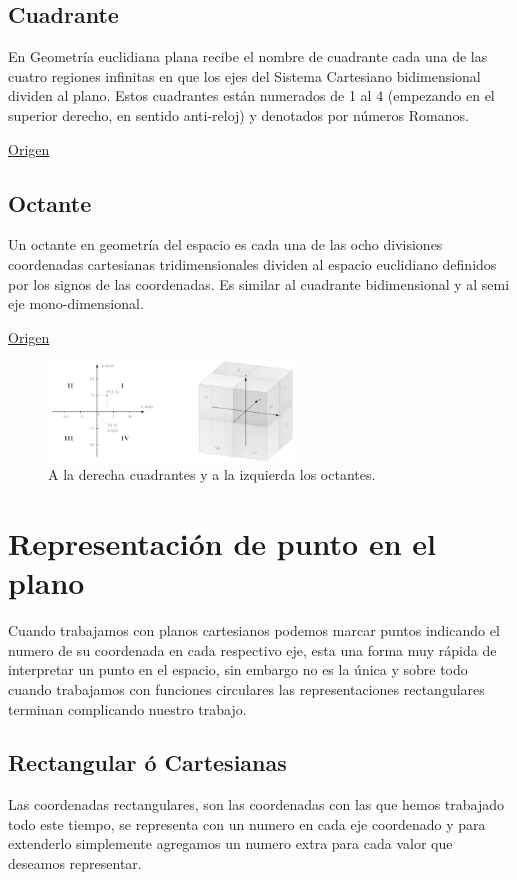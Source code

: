 \documentclass{article}
\begin{document}
\subsection{Cuadrante}
\label{sec:org2305e20}
En Geometría euclidiana plana recibe el nombre de cuadrante cada una de las cuatro regiones infinitas en que los ejes del Sistema Cartesiano bidimensional dividen al plano. Estos cuadrantes están numerados de 1 al 4 (empezando en el superior derecho, en sentido anti-reloj) y denotados por números Romanos.

\href{https://es.wikipedia.org/wiki/Cuadrante\_(geometr\%C3\%ADa)}{Origen}

\subsection{Octante}
\label{sec:org06f405a}
Un octante en geometría del espacio es cada una de las ocho divisiones coordenadas cartesianas tridimensionales dividen al espacio euclidiano definidos por los signos de las coordenadas. Es similar al cuadrante bidimensional y al semi eje mono-dimensional.

\href{https://es.wikipedia.org/wiki/Octante\_(geometr\%C3\%ADa)}{Origen}

\begin{figure}[htbp]
\centering
\includegraphics[width=250px]{img/cuadrante-y-octante-2.png}
\caption{A la derecha cuadrantes y a la izquierda los octantes.}
\end{figure}

\section{Representación de punto en el plano}
\label{sec:org33d7cda}
Cuando trabajamos con planos cartesianos podemos marcar puntos indicando el numero de su coordenada en cada respectivo eje, esta una forma muy rápida de interpretar un punto en el espacio, sin embargo no es la única y sobre todo cuando trabajamos con funciones circulares las representaciones rectangulares terminan complicando nuestro trabajo.

\subsection{Rectangular ó Cartesianas}
\label{sec:orga745184}
Las coordenadas rectangulares, son las coordenadas con las que hemos trabajado todo este tiempo, se representa con un numero en cada eje coordenado y para extenderlo simplemente agregamos un numero extra para cada valor que deseamos representar. 
\end{document}
